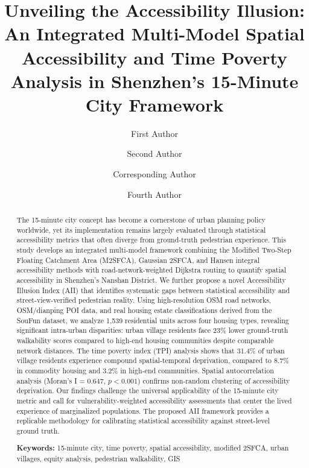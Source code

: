 \documentclass[preprint,12pt,authoryear]{elsarticle}
\begin{document}
\begin{frontmatter}

\title{Unveiling the Accessibility Illusion: An Integrated Multi-Model Spatial Accessibility and Time Poverty Analysis in Shenzhen's 15-Minute City Framework}

\author[1]{First Author}
\author[1,2]{Second Author}
\author[3,4]{Corresponding Author}
\author[1]{Fourth Author}

\address[1]{School of Architecture and Urban Planning, [University Name], [City], [Country]}
\address[2]{Urban Data Science Laboratory, [University Name], [City], [Country]}
\address[3]{AI and Smart City Laboratory, Stanford University, Stanford, CA 94305, USA}
\address[4]{Department of Urban Studies, [University Name], [City], [Country]}

\begin{abstract}
The 15-minute city concept has become a cornerstone of urban planning policy worldwide, yet its implementation remains largely evaluated through statistical accessibility metrics that often diverge from ground-truth pedestrian experience. This study develops an integrated multi-model framework combining the Modified Two-Step Floating Catchment Area (M2SFCA), Gaussian 2SFCA, and Hansen integral accessibility methods with road-network-weighted Dijkstra routing to quantify spatial accessibility in Shenzhen's Nanshan District. We further propose a novel Accessibility Illusion Index (AII) that identifies systematic gaps between statistical accessibility and street-view-verified pedestrian reality. Using high-resolution OSM road networks, OSM/dianping POI data, and real housing estate classifications derived from the SouFun dataset, we analyze 1,539 residential units across four housing types, revealing significant intra-urban disparities: urban village residents face 23\% lower ground-truth walkability scores compared to high-end housing communities despite comparable network distances. The time poverty index (TPI) analysis shows that 31.4\% of urban village residents experience compound spatial-temporal deprivation, compared to 8.7\% in commodity housing and 3.2\% in high-end communities. Spatial autocorrelation analysis (Moran's I = 0.647, $p < 0.001$) confirms non-random clustering of accessibility deprivation. Our findings challenge the universal applicability of the 15-minute city metric and call for vulnerability-weighted accessibility assessments that center the lived experience of marginalized populations. The proposed AII framework provides a replicable methodology for calibrating statistical accessibility against street-level ground truth.

\vskip 0.2in
\noindent\textbf{Keywords:} 15-minute city, time poverty, spatial accessibility, modified 2SFCA, urban villages, equity analysis, pedestrian walkability, GIS
\end{abstract}

\end{frontmatter}
\end{document}
